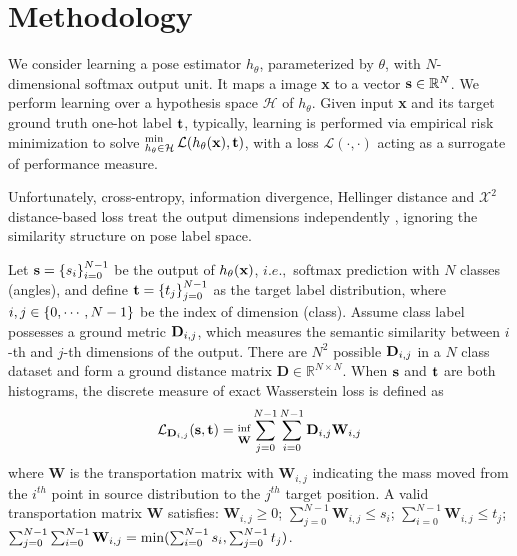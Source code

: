 \section{Methodology}

We consider learning a pose estimator ${h}_\theta$, parameterized by $\theta$, with $N$-dimensional softmax output unit. It maps a image {\rm\textbf{x}} to a vector ${\rm\textbf{s}}\in\mathbb{R}^N$. We perform learning over a hypothesis space $\mathcal{H}$ of ${h}_\theta$. Given input {\rm\textbf{x}} and its target ground truth one-hot label ${\rm\textbf{t}}$, typically, learning is performed via empirical risk minimization to solve $\mathop{}_{{h}_\theta\in\mathcal{H}}^{\rm min}\mathcal{L}({h}_\theta({\rm\textbf{x}}),{\rm\textbf{t}})$, with a loss $\mathcal{L}(\cdot,\cdot)$ acting as a surrogate of performance measure.

Unfortunately, cross-entropy, information divergence, Hellinger distance and $\mathcal{X}^2$ distance-based loss treat the output dimensions independently \cite{frogner2015learning}, ignoring the similarity structure on pose label space.  

Let ${\rm\textbf{s}}=\left\{s_i\right\}_{i=0}^{N-1}$ be the output of ${h}_\theta({\rm\textbf{x}})$, $i.e.,$ softmax prediction with $N$ classes (angles), and define ${\rm\textbf{t}}=\left\{t_j\right\}_{j=0}^{N-1}$ as the target label distribution, where $i,j\in\left\{0,\cdots,{\small N-1}\right\}$ be the index of dimension (class). Assume class label possesses a ground metric ${\rm\textbf{D}}_{i,j}$, which measures the semantic similarity between $i$-th and $j$-th dimensions of the output. There are $N^2$ possible ${\rm\textbf{D}}_{i,j}$ in a $N$ class dataset and form a ground distance matrix $\textbf{D}\in\mathbb{R}^{N\times N}$. When ${\rm\textbf{s}}$ and ${\rm\textbf{t}}$ are both histograms, the discrete measure of exact Wasserstein loss is defined as \begin{equation}
\mathcal{L}_{\textbf{D}_{i,j}}({\rm{\textbf{s},\textbf{t}}})=\mathop{}_{\textbf{W}}^{{\rm inf}}\sum_{j=0}^{N-1}\sum_{i=0}^{N-1}\textbf{D}_{i,j}\textbf{W}_{i,j} \label{con:df}
\end{equation} where \textbf{W} is the transportation matrix with \textbf{W}$_{i,j}$ indicating the mass moved from the $i^{th}$ point in source distribution to the $j^{th}$ target position. A valid transportation matrix \textbf{W} satisfies: $\textbf{W}_{i,j}\geq 0$; $\sum_{j=0}^{N-1}\textbf{W}_{i,j}\leq s_i$; $\sum_{i=0}^{N-1}\textbf{W}_{i,j}\leq t_j$; $\sum_{j=0}^{N-1}\sum_{i=0}^{N-1}\textbf{W}_{i,j}={\rm min}(\sum_{i=0}^{N-1}s_i,\sum_{j=0}^{N-1}t_j)$.



